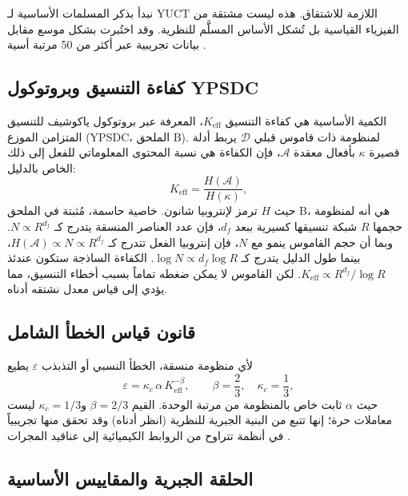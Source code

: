 \documentclass[12pt,a4paper]{article}
\newcommand{\kappac}{\kappa_c}
\newcommand{\Keff}{K_{\mathrm{eff}}}
\newcommand{\betaf}{\beta}
\begin{document}
	نبدأ بذكر المسلمات الأساسية لـ YUCT اللازمة للاشتقاق. هذه ليست مشتقة من الفيزياء القياسية بل تُشكل الأساس المسلَّم للنظرية. وقد اختُبرت بشكل موسع مقابل بيانات تجريبية عبر أكثر من 50 مرتبة أسية \cite{AppendixL}.
	
	\subsection{كفاءة التنسيق وبروتوكول YPSDC}
	
	الكمية الأساسية هي كفاءة التنسيق \(K_{\mathrm{eff}}\)، المعرفة عبر بروتوكول ياكوشيف للتنسيق المتزامن الموزع (YPSDC، الملحق B). لمنظومة ذات قاموس قبلي \(\mathcal{D}\) يربط أدلة قصيرة \(\kappa\) بأفعال معقدة \(\mathcal{A}\)، فإن الكفاءة هي نسبة المحتوى المعلوماتي للفعل إلى ذلك الخاص بالدليل:
	\begin{equation}
		\Keff = \frac{H(\mathcal{A})}{H(\kappa)},
		\label{eq:keff-def}
	\end{equation}
	حيث \(H\) ترمز لإنتروبيا شانون. خاصية حاسمة، مُثبتة في الملحق B، هي أنه لمنظومة حجمها \(R\) شبكة تنسيقها كسيرية ببعد \(d_f\)، فإن عدد العناصر المنسقة يتدرج كـ \(N \propto R^{d_f}\). وبما أن حجم القاموس ينمو مع \(N\)، فإن إنتروبيا الفعل تتدرج كـ \(H(\mathcal{A}) \propto N \propto R^{d_f}\)، بينما طول الدليل يتدرج كـ \(\log N \propto d_f \log R\). الكفاءة الساذجة ستكون عندئذ \(\Keff \propto R^{d_f} / \log R\). لكن القاموس لا يمكن ضغطه تماماً بسبب أخطاء التنسيق، مما يؤدي إلى قياس معدل نشتقه أدناه.
	
	\subsection{قانون قياس الخطأ الشامل}
	
	لأي منظومة منسقة، الخطأ النسبي أو التذبذب \(\varepsilon\) يطيع
	\begin{equation}
		\varepsilon = \kappac \, \alpha \, \Keff^{-\betaf}, \qquad \betaf = \frac{2}{3}, \quad \kappac = \frac{1}{3},
		\label{eq:universal}
	\end{equation}
	حيث \(\alpha\) ثابت خاص بالمنظومة من مرتبة الوحدة. القيم \(\betaf = 2/3\) و\(\kappac = 1/3\) ليست معاملات حرة؛ إنها تتبع من البنية الجبرية للنظرية (انظر أدناه) وقد تحقق منها تجريبياً في أنظمة تتراوح من الروابط الكيميائية إلى عناقيد المجرات \cite{AppendixL}.
	
	\subsection{الحلقة الجبرية والمقاييس الأساسية}
	
\end{document}
